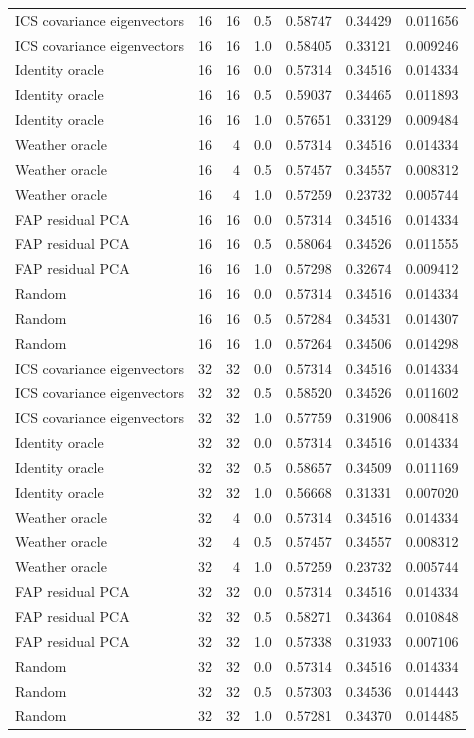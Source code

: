 \begin{tabular}{lrrrrrr}
ICS covariance eigenvectors & 16 & 16 & 0.5 & 0.58747 & 0.34429 & 0.011656 \\
ICS covariance eigenvectors & 16 & 16 & 1.0 & 0.58405 & 0.33121 & 0.009246 \\
Identity oracle & 16 & 16 & 0.0 & 0.57314 & 0.34516 & 0.014334 \\
Identity oracle & 16 & 16 & 0.5 & 0.59037 & 0.34465 & 0.011893 \\
Identity oracle & 16 & 16 & 1.0 & 0.57651 & 0.33129 & 0.009484 \\
Weather oracle & 16 & 4 & 0.0 & 0.57314 & 0.34516 & 0.014334 \\
Weather oracle & 16 & 4 & 0.5 & 0.57457 & 0.34557 & 0.008312 \\
Weather oracle & 16 & 4 & 1.0 & 0.57259 & 0.23732 & 0.005744 \\
FAP residual PCA & 16 & 16 & 0.0 & 0.57314 & 0.34516 & 0.014334 \\
FAP residual PCA & 16 & 16 & 0.5 & 0.58064 & 0.34526 & 0.011555 \\
FAP residual PCA & 16 & 16 & 1.0 & 0.57298 & 0.32674 & 0.009412 \\
Random & 16 & 16 & 0.0 & 0.57314 & 0.34516 & 0.014334 \\
Random & 16 & 16 & 0.5 & 0.57284 & 0.34531 & 0.014307 \\
Random & 16 & 16 & 1.0 & 0.57264 & 0.34506 & 0.014298 \\
ICS covariance eigenvectors & 32 & 32 & 0.0 & 0.57314 & 0.34516 & 0.014334 \\
ICS covariance eigenvectors & 32 & 32 & 0.5 & 0.58520 & 0.34526 & 0.011602 \\
ICS covariance eigenvectors & 32 & 32 & 1.0 & 0.57759 & 0.31906 & 0.008418 \\
Identity oracle & 32 & 32 & 0.0 & 0.57314 & 0.34516 & 0.014334 \\
Identity oracle & 32 & 32 & 0.5 & 0.58657 & 0.34509 & 0.011169 \\
Identity oracle & 32 & 32 & 1.0 & 0.56668 & 0.31331 & 0.007020 \\
Weather oracle & 32 & 4 & 0.0 & 0.57314 & 0.34516 & 0.014334 \\
Weather oracle & 32 & 4 & 0.5 & 0.57457 & 0.34557 & 0.008312 \\
Weather oracle & 32 & 4 & 1.0 & 0.57259 & 0.23732 & 0.005744 \\
FAP residual PCA & 32 & 32 & 0.0 & 0.57314 & 0.34516 & 0.014334 \\
FAP residual PCA & 32 & 32 & 0.5 & 0.58271 & 0.34364 & 0.010848 \\
FAP residual PCA & 32 & 32 & 1.0 & 0.57338 & 0.31933 & 0.007106 \\
Random & 32 & 32 & 0.0 & 0.57314 & 0.34516 & 0.014334 \\
Random & 32 & 32 & 0.5 & 0.57303 & 0.34536 & 0.014443 \\
Random & 32 & 32 & 1.0 & 0.57281 & 0.34370 & 0.014485 \\
\bottomrule
\end{tabular}
